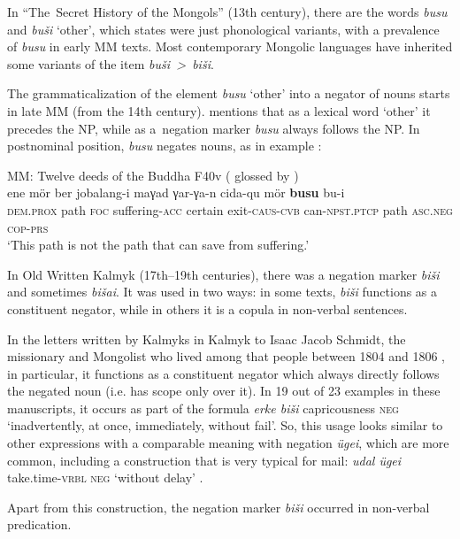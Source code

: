 \documentclass[output=paper,draft,draftmode,colorlinks,citecolor=brown]{langscibook}
\begin{document}
In “The Secret History of the Mongols” (13th century), there are the words \textit{busu} and \textit{buši} ‘other’, which \citet[134]{yu1991a} states were just phonological variants, with a prevalence of \textit{busu} in early MM texts. Most contemporary Mongolic languages have inherited some variants of the item \textit{buši > biši}.

The grammaticalization of the element \textit{busu} ‘other’ into a negator of nouns starts in late MM (from the 14th century). \citet[127]{yu1991a} mentions that as a lexical word ‘other’ it precedes the NP, while as a negation marker \textit{busu} always follows the NP. In postnominal position, \textit{busu} negates nouns, as in example :


\ea\label{ex:bashkir:50} MM: Twelve deeds of the Buddha F40v (\citealt[141]{poppe_1967} glossed by \citealt[105]{brosig2015a}) \label{ex:BK50}\\
	\gll ene				mör	ber	jobalang-i		maγad	γar-γa-n			cida-qu			mör	\textbf{busu}			bu-i\\
	\textsc{dem.prox}	path	\textsc{foc}	suffering-\textsc{acc}	certain	exit-\textsc{caus-cvb}	can-\textsc{npst.ptcp}	path	\textsc{asc.neg}		\textsc{cop-prs}\\
	\glt `This path is not the path that can save from suffering.'
\z

In Old Written Kalmyk (17th–19th centuries), there was a negation marker \textit{biši} and sometimes \textit{bišai}. It was used in two ways: in some texts, \textit{biši} functions as a constituent negator, while in others it is a copula in non-verbal sentences.

In the letters written by Kalmyks in Kalmyk to Isaac Jacob Schmidt, the missionary and Mongolist who lived among that people between 1804 and 1806 \citep{krueger2002a}, in particular, it functions as a constituent negator which always directly follows the negated noun (i.e. has scope only over it). In 19 out of 23 examples in these manuscripts, it occurs as part of the formula \textit{erke biši} capricousness \textsc{neg} ‘inadvertently, at once, immediately, without fail’. So, this usage looks similar to other expressions with a comparable meaning with negation \textit{ügei}, which are more common, including a construction that is very typical for mail: \textit{udal ügei} take.time-\textsc{vrbl neg} ‘without delay’ \citep[57]{krueger2002a}.

Apart from this construction, the negation marker \textit{biši} occurred in non-verbal predication.
\end{document}
